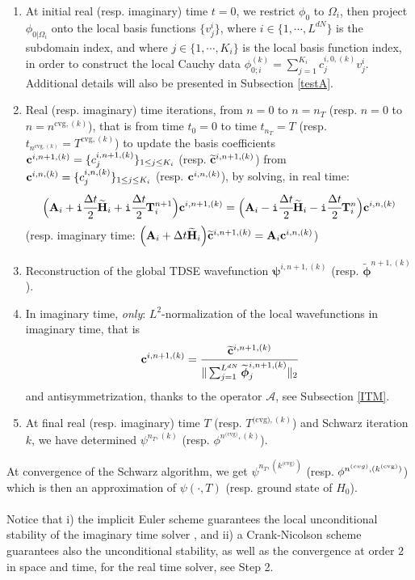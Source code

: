 \begin{enumerate}
\item At initial real (resp. imaginary) time $t=0$, we restrict $\phi_0$ to $\Omega_i$, then project $\phi_{0|\Omega_i}$ onto the local basis functions $\big\{v^i_j\}$, where $i \in \{1,\cdots,L^{dN}\}$ is the subdomain index, and where $j \in \{1,\cdots,K_i\}$ is the local basis function index, in order to construct the local Cauchy data $\phi_{0;i}^{(k)} = \sum_{j=1}^{K_i}c_{j}^{i,0,(k)}v_j^i$. Additional details will also be presented in Subsection \ref{testA}.
\item Real (resp. imaginary) time iterations, from $n=0$ to $n=n_T$ (resp. $n=0$ to $n=n^{\textrm{cvg},(k)}$), that is from time $t_0=0$ to time $t_{n_{T}}=T$ (resp. $t_{n^{\textrm{cvg},(k)}}=T^{\textrm{cvg},(k)}$) to update the basis coefficients ${\bf c}^{i,n+1,(k)} = \{c_{j}^{i,n+1,(k)}\}_{1 \leq j \leq K_i}$ (resp. $\widetilde{{\bf c}}^{i,n+1,(k)}$) from ${\bf c}^{i,n,(k)} = \{c_{j}^{i,n,(k)}\}_{1 \leq j \leq K_i}$ (resp. ${\bf c}^{i,n,(k)}$), by solving, in real time:
\begin{eqnarray*}
\Big({\bf A}_i+{\tt i}\cfrac{\Delta t}{2}\widetilde{{\bf H}}_i+{\tt i}\cfrac{\Delta t}{2}{\bf T}_i^{n+1}\Big){\bf c}^{i,n+1,(k)} = \Big({\bf A}_i-{\tt i}\cfrac{\Delta t}{2}\widetilde{{\bf H}}_i-{\tt i}\cfrac{\Delta t}{2}{\bf T}_i^{n}\Big){\bf c}^{i,n,(k)}
\end{eqnarray*}
(resp. imaginary time: $\Big({\bf A}_i+\Delta t\widetilde{{\bf H}}_i\Big)\widetilde{{\bf c}}^{i,n+1,(k)} = {\bf A}_i{\bf c}^{i,n,(k)}$)
\item Reconstruction of the global TDSE wavefunction ${\boldsymbol \psi}^{i,n+1,(k)}$ (resp. $\widetilde{{\boldsymbol \phi}}^{n+1,(k)}$).
\item In imaginary time, {\it only}:  $L^2$-normalization of the local wavefunctions in imaginary time, that is
\begin{eqnarray*}
{\bf c}^{i,n+1,(k)} = \cfrac{\widetilde{{\bf c}}^{i,n+1,(k)}}{\|\sum_{j=1}^{L^{dN}}\widetilde{{\boldsymbol \phi}}_j^{i,n+1,(k)}\|_{2}}
\end{eqnarray*}
and antisymmetrization, thanks to the operator $\mathcal{A}$, see Subsection \ref{ITM}.
\item At final real (resp. imaginary) time $T$ (resp. $T^{\textrm{(cvg)},(k)}$) and Schwarz iteration $k$, we have determined $\psi^{n_T,(k)}$ (resp. $\phi^{n^{\textrm{(cvg)}},(k)}$).
\end{enumerate}
\noindent At convergence of the Schwarz algorithm, we get $\psi^{n_T,(k^{\textrm{(cvg)}})}$ (resp. $\phi^{n^{\textrm(cvg)},(k^{\textrm{(cvg)}})}$) which is then an approximation of $\psi(\cdot,T)$ (resp. ground state of $H_0$).\\
\\
Notice that i) the implicit Euler scheme guarantees the local unconditional stability of the imaginary time solver \cite{bao}, and ii) a Crank-Nicolson scheme guarantees also the unconditional stability, as well as the convergence at order $2$ in space and time, for the real time solver, see Step 2.
